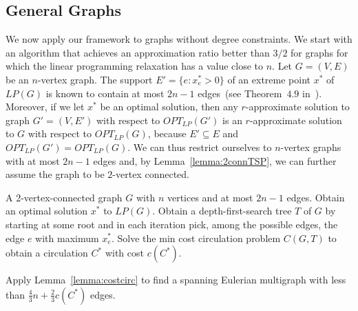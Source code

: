 \documentclass[letterpaper,11pt]{article}
\newcommand{\LP}[1]{\ensuremath{LP(#1)}}
\newcommand{\OLP}[1]{\ensuremath{OPT_{LP}(#1)}}
\begin{document}
\subsection{General Graphs}
We now apply our framework to graphs without degree constraints.  We
start with an algorithm that achieves an approximation ratio better
than $3/2$ for graphs for which the linear programming relaxation has
a value close to $n$.  Let $G= (V,E)$ be an $n$-vertex graph.  The
support $E' = \{e: x_e^* > 0\}$ of an extreme point $x^*$ of \LP{G} is
known to contain at most $2n-1$ edges~(see Theorem~$4.9$
in~\cite{CFN85}). Moreover, if we let $x^*$ be an optimal solution,
then any $r$-approximate solution to graph $G'=(V,E')$ with respect to
\OLP{G'} is an $r$-approximate solution to $G$ with respect to
\OLP{G}, because $E' \subseteq E$ and $\OLP{G'} = \OLP{G}$. We can
thus restrict ourselves to $n$-vertex graphs with at most $2n-1$ edges
and, by Lemma~\ref{lemma:2connTSP}, we can further assume the graph to
be $2$-vertex connected.
\begin{algorithm}[h]
\begin{algorithmic}[1]
\REQUIRE A 2-vertex-connected graph $G$ with $n$ vertices and at most $2n-1$ edges.
\STATE Obtain an optimal solution $x^*$ to \LP{G}.
\STATE Obtain a depth-first-search tree $T$ of $G$ by starting at some
  root and in each iteration pick, among the possible edges, the edge $e$
  with maximum $x_e^*$.
\STATE Solve the min cost circulation problem $C(G,T)$ to obtain a circulation $C^*$ with cost $c(C^*)$.

\STATE Apply Lemma~\ref{lemma:costcirc} to find a spanning Eulerian
  multigraph with less than $\frac{4}{3} n + \frac{2}{3} c(C^*)$ edges.
\end{algorithmic}
\caption{}
\label{alg:allgraphs}
\end{algorithm}
\end{document}
